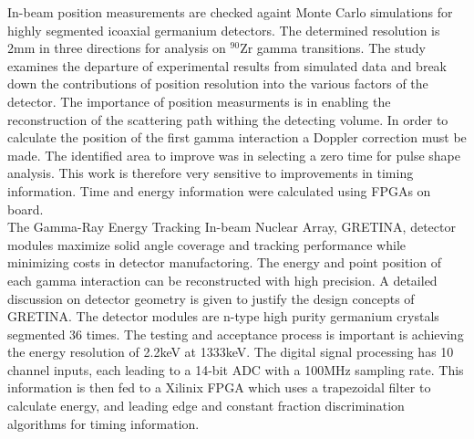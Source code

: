\documentclass[12pt]{article}
\begin{document}
{\large\textbf{\cite{Descovich2005535}}}
In-beam position measurements are checked againt Monte Carlo simulations for highly segmented icoaxial germanium detectors. The determined resolution is 2mm in three directions for analysis on $^{90}\mbox{Zr}$ gamma transitions. The study examines the departure of experimental results from simulated data and break down the contributions of position resolution into the various factors of the detector.
The importance of position measurments is in enabling the reconstruction of the scattering path withing the detecting volume. In order to calculate the position of the first gamma interaction a Doppler correction must be made. The identified area to improve was in selecting a zero time for pulse shape analysis. This work is therefore very sensitive to improvements in timing information. Time and energy information were calculated using FPGAs on board.
\\[20pt]


{\large\textbf{\cite{Paschalis201344}}}
The Gamma-Ray Energy Tracking In-beam Nuclear Array, GRETINA, detector modules maximize solid angle coverage and tracking performance while minimizing costs in detector manufactoring. The energy and point position of each gamma interaction can be reconstructed with high precision. A detailed discussion on detector geometry is given to justify the design concepts of GRETINA. The detector modules are n-type high purity germanium crystals segmented 36 times. The testing and acceptance process is important is achieving the energy resolution of 2.2keV at 1333keV. The digital signal processing has 10 channel inputs, each leading to a 14-bit ADC with a 100MHz sampling rate. This information is then fed to a Xilinix FPGA which uses a trapezoidal filter to calculate energy, and leading edge and constant fraction discrimination algorithms for timing information.
\\[20pt]




\end{document}
